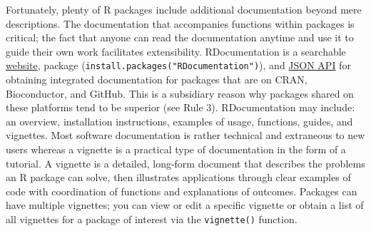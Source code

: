 \documentclass[10pt,letterpaper]{article}
\begin{document}
Fortunately, plenty of R packages include additional documentation
beyond mere descriptions. The documentation that accompanies functions
within packages is critical; the fact that anyone can read the
documentation anytime and use it to guide their own work facilitates
extensibility. RDocumentation is a searchable
\href{https://www.rdocumentation.org/}{website}, package
(\texttt{install.packages("RDocumentation")}), and
\href{https://www.rdocumentation.org/docs/}{JSON API} for obtaining
integrated documentation for packages that are on CRAN, Bioconductor,
and GitHub. This is a subsidiary reason why packages shared on these
platforms tend to be superior (see Rule 3). RDocumentation may include:
an overview, installation instructions, examples of usage, functions,
guides, and vignettes. Most software documentation is rather technical
and extraneous to new users whereas a vignette is a practical type of
documentation in the form of a tutorial. A vignette is a detailed,
long-form document that describes the problems an R package can solve,
then illustrates applications through clear examples of code with
coordination of functions and explanations of outcomes. Packages can
have multiple vignettes; you can view or edit a specific vignette or
obtain a list of all vignettes for a package of interest via the
\texttt{vignette()} function.
\end{document}
